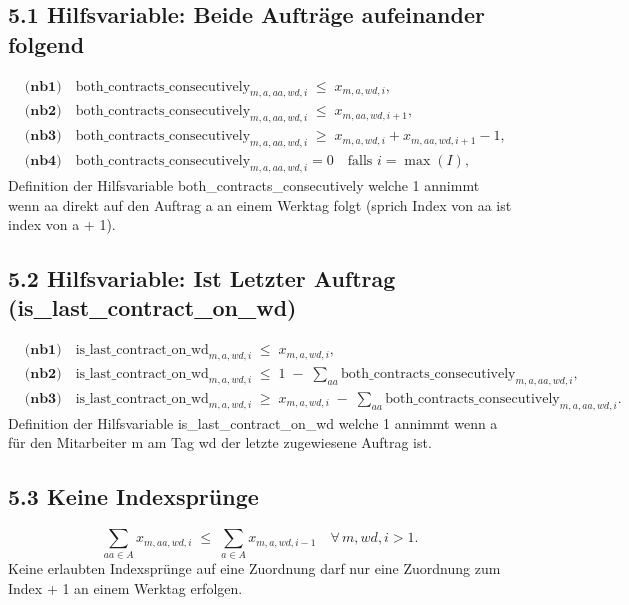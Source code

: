 \documentclass[12pt,a4paper]{article}
\begin{document}
\subsection*{5.1 Hilfsvariable: Beide Aufträge aufeinander folgend}
\begin{align*}
&\textbf{(nb1)}\quad
  \text{both\_contracts\_consecutively}_{m,a,aa,wd,i}
  \;\le\;
  x_{m,a,wd,i},
\\
&\textbf{(nb2)}\quad
  \text{both\_contracts\_consecutively}_{m,a,aa,wd,i}
  \;\le\;
  x_{m,aa,wd,i+1},
\\
&\textbf{(nb3)}\quad
  \text{both\_contracts\_consecutively}_{m,a,aa,wd,i}
  \;\ge\;
  x_{m,a,wd,i} + x_{m,aa,wd,i+1} - 1,
\\
&\textbf{(nb4)}\quad
  \text{both\_contracts\_consecutively}_{m,a,aa,wd,i}
  = 0
  \quad\text{falls } i=\max(I),
\end{align*}
Definition der Hilfsvariable both\_contracts\_consecutively welche 1 annimmt wenn aa direkt auf den Auftrag a an einem Werktag folgt (sprich Index von aa ist index von a + 1).

\subsection*{5.2 Hilfsvariable: Ist Letzter Auftrag (is\_last\_contract\_on\_wd)}
\begin{align*}
&\textbf{(nb1)}\quad
  \text{is\_last\_contract\_on\_wd}_{m,a,wd,i}
  \;\le\;
  x_{m,a,wd,i},
\\
&\textbf{(nb2)}\quad
  \text{is\_last\_contract\_on\_wd}_{m,a,wd,i}
  \;\le\; 
  1 \;-\;\sum_{aa}\text{both\_contracts\_consecutively}_{m,a,aa,wd,i},
\\
&\textbf{(nb3)}\quad
  \text{is\_last\_contract\_on\_wd}_{m,a,wd,i}
  \;\ge\;
  x_{m,a,wd,i}
  \;-\;
  \sum_{aa}\text{both\_contracts\_consecutively}_{m,a,aa,wd,i}.
\end{align*}
Definition der Hilfsvariable is\_last\_contract\_on\_wd welche 1 annimmt wenn a für den Mitarbeiter m am Tag wd der letzte zugewiesene Auftrag ist.

\subsection*{5.3 Keine Indexsprünge}
\[
  \sum_{aa \in A} x_{m,aa,wd,i}
  \;\le\;
  \sum_{a \in A} x_{m,a,wd,i-1}
  \quad \forall\,m,wd,i>1.
\]
Keine erlaubten Indexsprünge auf eine Zuordnung darf nur eine Zuordnung zum Index + 1 an einem Werktag erfolgen.
\end{document}
